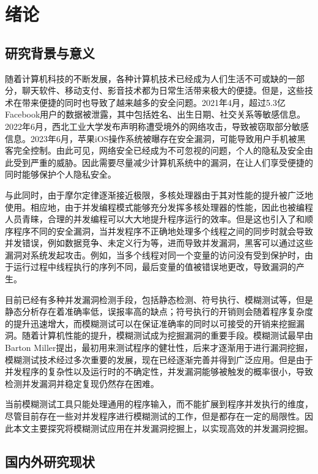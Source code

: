 \clearpage{}

\section{绪论}

\subsection{研究背景与意义}

随着计算机科技的不断发展，各种计算机技术已经成为人们生活不可或缺的一部分，聊天软件、移动支付、影音技术都为日常生活带来极大的便捷。但是，这些技术在带来便捷的同时也导致了越来越多的安全问题。2021年4月，超过5.3亿Facebook用户的数据被泄露，其中包括姓名、出生日期、社交关系等敏感信息。2022年6月，西北工业大学发布声明称遭受境外的网络攻击，导致被窃取部分敏感信息。2023年6月，苹果iOS操作系统被曝存在安全漏洞，可能导致用户手机被黑客完全控制。由此可见，网络安全已经成为不可忽视的问题，个人的隐私及安全由此受到严重的威胁。因此需要尽量减少计算机系统中的漏洞，在让人们享受便捷的同时能够保护个人隐私安全。

与此同时，由于摩尔定律逐渐接近极限，多核处理器由于其对性能的提升被广泛地使用。相应地，由于并发编程模式能够充分发挥多核处理器的性能，因此也被编程人员青睐，合理的并发编程可以大大地提升程序运行的效率。但是这也引入了和顺序程序不同的安全漏洞，当并发程序不正确地处理多个线程之间的同步时就会导致并发错误，例如数据竞争\cite{adve2010data}、未定义行为\cite{boehm2012nondeterminism}等，进而导致并发漏洞，黑客可以通过这些漏洞对系统发起攻击。例如，当多个线程对同一个变量的访问没有受到保护时，由于运行过程中线程执行的序列不同，最后变量的值被错误地更改，导致漏洞的产生。

目前已经有多种并发漏洞检测手段，包括静态检测、符号执行、模糊测试等，但是静态分析存在着准确率低，误报率高的缺点；符号执行的开销则会随着程序复杂度的提升迅速增大，而模糊测试可以在保证准确率的同时以可接受的开销来挖掘漏洞。随着计算机性能的提升，模糊测试成为挖掘漏洞的重要手段。模糊测试最早由Barton Miller\cite{takanen2018fuzzing}提出，最初用来测试程序的健壮性，后来才逐渐用于进行漏洞挖掘，模糊测试技术经过多次重要的发展，现在已经逐渐完善并得到广泛应用。但是由于并发程序的复杂性以及运行时的不确定性，并发漏洞能够被触发的概率很小，导致检测并发漏洞并稳定复现仍然存在困难。

当前模糊测试工具只能处理通用的程序输入，而不能扩展到程序并发执行的维度，尽管目前存在一些对并发程序进行模糊测试的工作，但是都存在一定的局限性。因此本文主要探究将模糊测试应用在并发漏洞挖掘上，以实现高效的并发漏洞挖掘。


\subsection{国内外研究现状}

